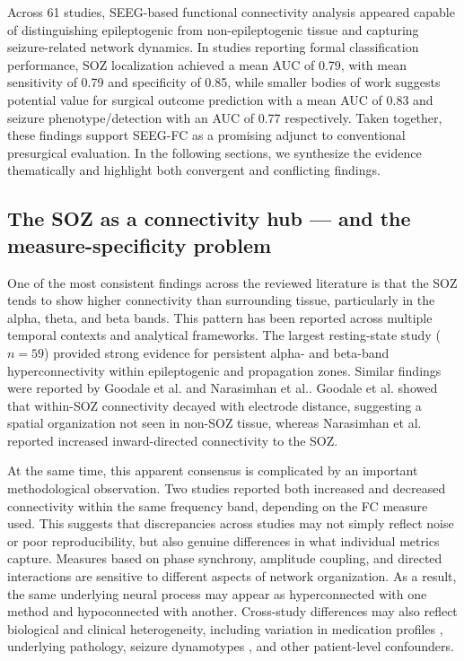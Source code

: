 \documentclass[12pt]{article}
\begin{document}
Across 61 studies, SEEG-based functional connectivity analysis appeared capable of distinguishing epileptogenic from non-epileptogenic tissue and capturing seizure-related network dynamics. In studies reporting formal classification performance, SOZ localization achieved a mean AUC of 0.79, with mean sensitivity of 0.79 and specificity of 0.85, while smaller bodies of work suggests potential value for surgical outcome prediction with a mean AUC of 0.83 and seizure phenotype/detection with an AUC of 0.77 respectively. Taken together, these findings support SEEG-FC as a promising adjunct to conventional presurgical evaluation. In the following sections, we synthesize the evidence thematically and highlight both convergent and conflicting findings.


\subsection{The SOZ as a connectivity hub --- and the measure-specificity problem}
One of the most consistent findings across the reviewed literature is that the SOZ tends to show higher connectivity than surrounding tissue, particularly in the alpha, theta, and beta bands. This pattern has been reported across multiple temporal contexts and analytical frameworks. The largest resting-state study \cite{lagarde2018interictal} ($n=59$) provided strong evidence for persistent alpha- and beta-band hyperconnectivity within epileptogenic and propagation zones. Similar findings were reported by Goodale et al.\cite{Goodale2020-lj} and Narasimhan et al.\cite{Narasimhan2020-af}. Goodale et al. showed that within-SOZ connectivity decayed with electrode distance, suggesting a spatial organization not seen in non-SOZ tissue, whereas Narasimhan et al. reported increased inward-directed connectivity to the SOZ.

At the same time, this apparent consensus is complicated by an important methodological observation. Two studies \cite{Vila-Vidal2024-ha, Hu2023-kr} reported both increased and decreased connectivity within the same frequency band, depending on the FC measure used. This suggests that discrepancies across studies may not simply reflect noise or poor reproducibility, but also genuine differences in what individual metrics capture. Measures based on phase synchrony, amplitude coupling, and directed interactions are sensitive to different aspects of network organization. As a result, the same underlying neural process may appear as hyperconnected with one method and hypoconnected with another. Cross-study differences may also reflect biological and clinical heterogeneity, including variation in medication profiles \cite{Akkol_bc}, underlying pathology, seizure dynamotypes \cite{Saggio2020-sr}, and other patient-level confounders.
\end{document}
